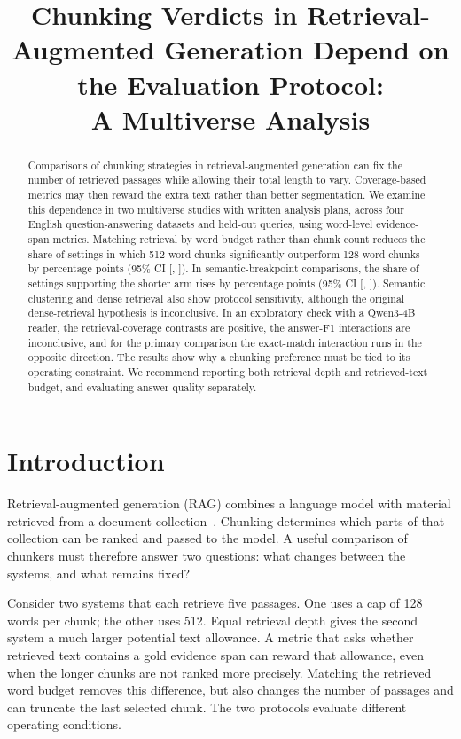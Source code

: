 \documentclass[11pt]{article}
\title{Chunking Verdicts in Retrieval-Augmented Generation Depend on the Evaluation Protocol:\texorpdfstring{\\}{ }A Multiverse Analysis}
\author{\AuthorName}
\date{}
\begin{document}
\maketitle

\begin{abstract}
Comparisons of chunking strategies in retrieval-augmented generation can fix the number of retrieved passages while allowing their total length to vary. Coverage-based metrics may then reward the extra text rather than better segmentation. We examine this dependence in two multiverse studies with written analysis plans, across four English question-answering datasets and \EoneNq{} held-out queries, using word-level evidence-span metrics. Matching retrieval by word budget rather than chunk count reduces the share of settings in which 512-word chunks significantly outperform 128-word chunks by \HOneEst{} percentage points (95\% CI [\HOneLo, \HOneHi]). In semantic-breakpoint comparisons, the share of settings supporting the shorter arm rises by \HFourEst{} percentage points (95\% CI [\HFourLo, \HFourHi]). Semantic clustering and dense retrieval also show protocol sensitivity, although the original dense-retrieval hypothesis is inconclusive. In an exploratory check with a Qwen3-4B reader, the retrieval-coverage contrasts are positive, the answer-F1 interactions are inconclusive, and for the primary comparison the exact-match interaction runs in the opposite direction. The results show why a chunking preference must be tied to its operating constraint. We recommend reporting both retrieval depth and retrieved-text budget, and evaluating answer quality separately.
\end{abstract}

\section{Introduction}
Retrieval-augmented generation (RAG) combines a language model with material retrieved from a document collection~\cite{lewis2020rag,gao2023ragsurvey}. Chunking determines which parts of that collection can be ranked and passed to the model. A useful comparison of chunkers must therefore answer two questions: what changes between the systems, and what remains fixed?

Consider two systems that each retrieve five passages. One uses a cap of 128 words per chunk; the other uses 512. Equal retrieval depth gives the second system a much larger potential text allowance. A metric that asks whether retrieved text contains a gold evidence span can reward that allowance, even when the longer chunks are not ranked more precisely. Matching the retrieved word budget removes this difference, but also changes the number of passages and can truncate the last selected chunk. The two protocols evaluate different operating conditions.
\end{document}
